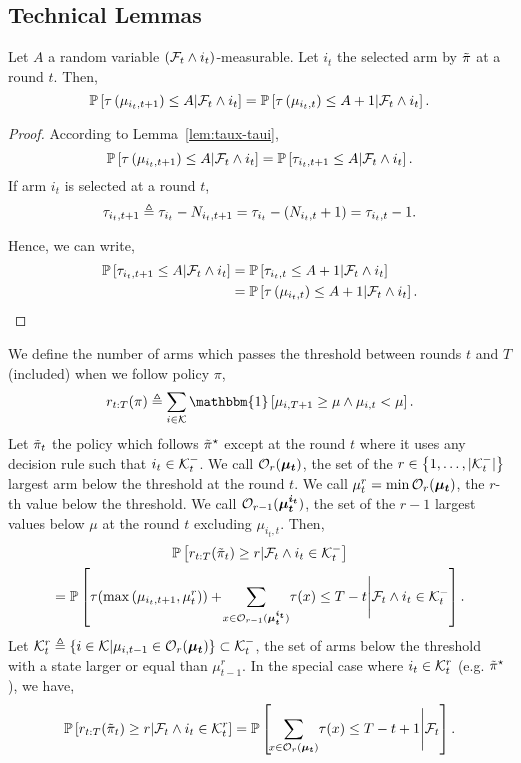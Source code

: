 \subsection{Technical Lemmas}
\begin{lemma}
\label{lem:tau+1}
Let $A$ a random variable $\left(\mathcal{F}_t \land i_t\right)$-measurable. Let $i_t$ the selected arm by $\Tilde{\pi}$ at a round $t$. Then,
\[
\mathbb{P}\left[ \tau\left(\mu_{i_t,t+1}\right) \leq A| \mathcal{F}_t \land i_t\right]  = \mathbb{P}\left[\tau\left(\mu_{i_t,t}\right) \leq A + 1| \mathcal{F}_t\land i_t\right].
\]
\end{lemma}
\begin{proof}
According to Lemma~\ref{lem:taux-taui},
\[
\mathbb{P}\left[ \tau\left(\mu_{i_t,t+1}\right) \leq A| \mathcal{F}_t \land i_t\right] = \mathbb{P}\left[ \tau_{i_t,t+1} \leq A| \mathcal{F}_t \land  i_t\right].
\]
If arm $i_t$ is selected at a round $t$, 
\[\tau_{i_t,t+1} \triangleq \tau_{i_t} - N_{i_t,t+1} = \tau_{i_t} - \left(N_{i_t,t} + 1\right) = \tau_{i_t,t}-1 .\]

Hence, we can write, 
\begin{align*}
\mathbb{P}\left[ \tau_{i_t,t+1} \leq A| \mathcal{F}_t \land i_t\right] &= \mathbb{P}\left[ \tau_{i_t,t} \leq A+1| \mathcal{F}_t \land  i_t\right]\\
&=\mathbb{P}\left[ \tau\left(\mu_{i_t,t}\right) \leq A+1| \mathcal{F}_t \land i_t\right].
\end{align*}
\end{proof}
\begin{lemma}
\label{lem:r-tau}
We define the number of arms which passes the threshold between rounds $t$ and $T$ (included) when we follow policy $\pi$, 
\begin{equation}
\label{eq:def-rtT}
r_{t:T}(\pi) \triangleq \sum_{i \in \arms} \mathbbm{1} \left[\mu_{i,T+1} \geq \mu \land \mu_{i,t} < \mu\right].
\end{equation}
Let $\Tilde{\pi}_{t}$ the policy which follows $\Tilde{\pi}^\star$ except at the round $t$ where it uses any decision rule such that $i_t \in \mathcal{K}_t^-$. We call $\mathcal{O}_r(\boldsymbol{\mu_t})$, the set of the $r \in \left\{1, \dots, |\mathcal{K}_t^-| \right\}$ largest arm below the threshold at the round $t$.  We call $\mu^{r}_{t} = \min \mathcal{O}_r(\boldsymbol{\mu_t})$, the $r$-th value below the threshold. We call $\mathcal{O}_{r-1}(\boldsymbol{\mu_t}^{\boldsymbol{i_t}})$, the set of the $r-1$ largest values below $\mu$ at the round $t$ excluding $\mu_{i_t,t}$. Then,
 \begin{multline*}
 \mathbb{P}\left[r_{t:T}(\Tilde{\pi}_t) \geq r| \mathcal{F}_t\land i_t \in \mathcal{K}_t^-\right] \\= \mathbb{P}\left[\tau(\max\left(\mu_{i_t,t+1}, \mu^{r}_{t}\right))+\!\sum_{x \in \mathcal{O}_{r-1}(\boldsymbol{\mu_t}^{\boldsymbol{i_t}})} \!\tau(x) \leq T - t  \Bigg| \mathcal{F}_t\land i_t \in \mathcal{K}_t^-\right].
 \end{multline*}
Let $\mathcal{K}_t^r \triangleq \left\{i\in \mathcal{K} | \mu_{i,t-1} \in \mathcal{O}_r(\boldsymbol{\mu_t})\right\} \subset \mathcal{K}_t^-$, the set of arms below the threshold with a state larger or equal than $\mu^{r}_{t-1}$. In the special case where $i_t \in \mathcal{K}_t^r$ (e.g. $\Tilde{\pi}^\star$), we have, 
  \begin{equation*}
 \mathbb{P}\left[r_{t:T}(\Tilde{\pi}_t) \geq r| \mathcal{F}_t\land i_t \in \mathcal{K}_t^r\right] = \mathbb{P}\left[\!\sum_{x \in \mathcal{O}_r(\boldsymbol{\mu_t})} \!\tau(x) \leq T - t + 1 \Bigg| \mathcal{F}_t\right].
 \end{equation*}
\end{lemma}
